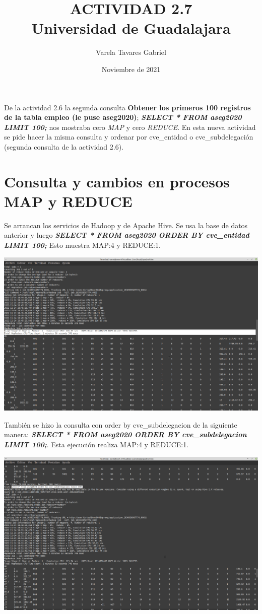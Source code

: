 \documentclass[16pt, spanish]{article}
\begin{document}
\title{{\textbf{ACTIVIDAD 2.7}}\\{\small Universidad de Guadalajara}\\}
\date{\small Noviembre de 2021}
\author{\small Varela Tavares Gabriel}
\maketitle

De la actividad 2.6 la segunda consulta \textbf{Obtener los primeros 100 registros de la tabla empleo (le puse aseg2020)};  \textbf{\textit{SELECT * FROM aseg2020 LIMIT 100;}} nos mostraba cero \textit{MAP} y cero \textit{REDUCE}. En esta nueva actividad se pide hacer la misma consulta y ordenar por cve\_entidad o cve\_subdelegación (segunda consulta de la actividad 2.6).  

\section*{Consulta y cambios en procesos MAP y REDUCE}

Se arrancan los servicios de Hadoop y de Apache Hive. Se usa la base de datos anterior y luego \textbf{\textit{SELECT * FROM aseg2020 ORDER BY cve\_entidad LIMIT 100;}} Esto muestra MAP:4 y REDUCE:1.

\begin{center}
 \includegraphics[width=0.9\columnwidth]{consulta.png}\\
 \footnotesize{}
\end{center}
\vspace{.5cm}

También se hizo la consulta con order by cve\_subdelegacion de la siguiente manera: \textbf{\textit{SELECT * FROM aseg2020 ORDER BY cve\_subdelegacion LIMIT 100;}}. Esta ejecución realiza MAP:4 y REDUCE:1.

\begin{center}
 \includegraphics[width=0.9\columnwidth]{consulta2.png}\\
 \footnotesize{}
\end{center}
\vspace{.5cm}
\end{document}
